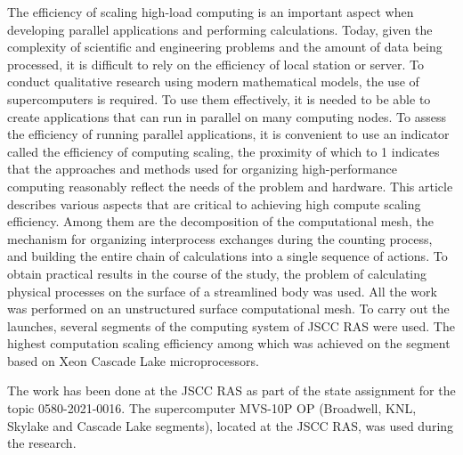 \documentclass[
11pt,%
tightenlines,%
twoside,%
onecolumn,%
nofloats,%
nobibnotes,%
nofootinbib,%
superscriptaddress,%
noshowpacs,%
centertags]%
{revtex4}
\begin{document}
The efficiency of scaling high-load computing is an important aspect when developing parallel applications and performing calculations.
Today, given the complexity of scientific and engineering problems and the amount of data being processed, it is difficult to rely on the efficiency of local station or server.
To conduct qualitative research using modern mathematical models, the use of supercomputers is required.
To use them effectively, it is needed to be able to create applications that can run in parallel on many computing nodes.
To assess the efficiency of running parallel applications, it is convenient to use an indicator called the efficiency of computing scaling, the proximity of which to 1 indicates that the approaches and methods used for organizing high-performance computing reasonably reflect the needs of the problem and hardware.
This article describes various aspects that are critical to achieving high compute scaling efficiency.
Among them are the decomposition of the computational mesh, the mechanism for organizing interprocess exchanges during the counting process, and building the entire chain of calculations into a single sequence of actions.
To obtain practical results in the course of the study, the problem of calculating physical processes on the surface of a streamlined body was used.
All the work was performed on an unstructured surface computational mesh.
To carry out the launches, several segments of the computing system of JSCC RAS were used.
The highest computation scaling efficiency among which was achieved on the segment based on Xeon Cascade Lake microprocessors.

\begin{acknowledgments}
The work has been done at the JSCC RAS as part of the state assignment for the topic 0580-2021-0016.
The supercomputer MVS-10P OP (Broadwell, KNL, Skylake and Cascade Lake segments), located at the JSCC RAS, was used during the research.
\end{acknowledgments}
\end{document}
